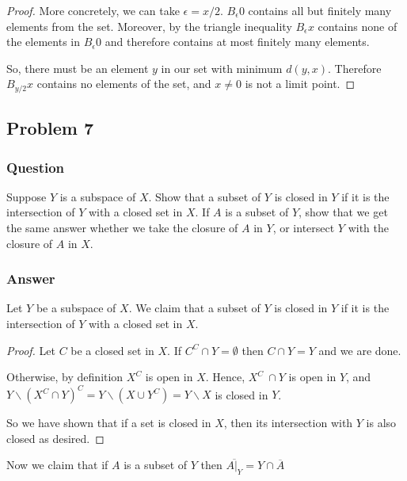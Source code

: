 \documentclass[10pt]{article}
\begin{document}
\begin{enumerate}
\begin{proof}
More concretely, we can take $\epsilon = x/2$. $B_\epsilon 0$ contains all but finitely many elements from the set. Moreover, by the triangle inequality $B_\epsilon x $ contains none of the elements in $B_\epsilon 0$ and therefore contains at most finitely many elements. 

So, there must be an element $y$ in our set with minimum $d(y,x)$. Therefore $B_{y/2}x$ contains no elements of the set, and $x\neq0$ is not a limit point.
\end{proof}
\end{enumerate}


\subsection{Problem 7}

\subsubsection{Question}
Suppose $Y$ is a subspace of $X$. Show that a subset of $Y$ is closed in $Y$ if it is the intersection of $Y$ with a closed set in $X$. If $A$ is a subset of $Y$, show that we get the same answer whether we take the closure of $A$ in $Y$, or intersect $Y$ with the closure of $A$ in $X$.
\subsubsection{Answer}
Let $Y$ be a subspace of $X$. We claim that a subset of $Y$ is closed in $Y$ if it is the intersection of $Y$ with a closed set in $X$.

\begin{proof}
Let $C$ be a closed set in $X$. If $C^C\cap Y= \emptyset$ then $C \cap Y = Y$ and we are done.

Otherwise, by definition $X^C$  is open in $X$. Hence, $X^C \ \cap Y $ is open in $Y$, and $Y  \backslash (X^C \cap Y)^C=Y \backslash (X \cup Y^C) = Y\backslash X$ is closed in $Y$. 

So we have shown that if a set is closed in $X$, then its intersection with $Y$ is also closed as desired. \end{proof}


Now we claim that if $A$ is a subset of $Y$ then $\overline{A|_Y}=Y\cap \overline{A}$
\end{document}
